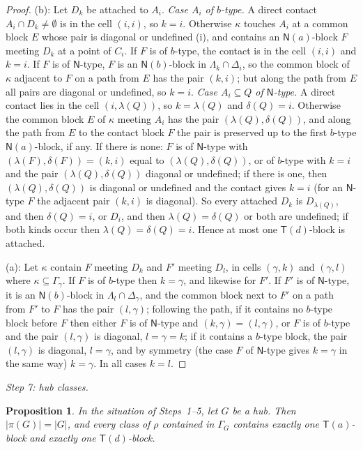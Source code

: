 \documentclass[11pt]{amsart}
\newtheorem{proposition}[theorem]{Proposition}
\theoremstyle{definition}
\newcommand{\T}{\mathsf{T}}
\newcommand{\N}{\mathsf{N}}
\begin{document}
\begin{proof}
(b): Let $D_k$ be attached to $A_i$. \emph{Case $A_i$ of $b$-type.} A direct contact $A_i\cap D_k\ne\emptyset$ is in the cell $(i,i)$, so $k=i$. Otherwise $\kappa$ touches $A_i$ at a common block $E$ whose pair is diagonal or undefined (i), and contains an $\N(a)$-block $F$ meeting $D_k$ at a point of $C_i$. If $F$ is of $b$-type, the contact is in the cell $(i,i)$ and $k=i$. If $F$ is of $\N$-type, $F$ is an $\N(b)$-block in $\Lambda_k\cap\Delta_i$, so the common block of $\kappa$ adjacent to $F$ on a path from $E$ has the pair $(k,i)$; but along the path from $E$ all pairs are diagonal or undefined, so $k=i$. \emph{Case $A_i\subseteq Q$ of $\N$-type.} A direct contact lies in the cell $(i,\lambda(Q))$, so $k=\lambda(Q)$ and $\delta(Q)=i$. Otherwise the common block $E$ of $\kappa$ meeting $A_i$ has the pair $(\lambda(Q),\delta(Q))$, and along the path from $E$ to the contact block $F$ the pair is preserved up to the first $b$-type $\N(a)$-block, if any. If there is none: $F$ is of $\N$-type with $(\lambda(F),\delta(F))=(k,i)$ equal to $(\lambda(Q),\delta(Q))$, or of $b$-type with $k=i$ and the pair $(\lambda(Q),\delta(Q))$ diagonal or undefined; if there is one, then $(\lambda(Q),\delta(Q))$ is diagonal or undefined and the contact gives $k=i$ (for an $\N$-type $F$ the adjacent pair $(k,i)$ is diagonal). So every attached $D_k$ is $D_{\lambda(Q)}$, and then $\delta(Q)=i$, or $D_i$, and then $\lambda(Q)=\delta(Q)$ or both are undefined; if both kinds occur then $\lambda(Q)=\delta(Q)=i$. Hence at most one $\T(d)$-block is attached.

(a): Let $\kappa$ contain $F$ meeting $D_k$ and $F'$ meeting $D_l$, in cells $(\gamma,k)$ and $(\gamma,l)$ where $\kappa\subseteq\Gamma_\gamma$. If $F$ is of $b$-type then $k=\gamma$, and likewise for $F'$. If $F'$ is of $\N$-type, it is an $\N(b)$-block in $\Lambda_l\cap\Delta_\gamma$, and the common block next to $F'$ on a path from $F'$ to $F$ has the pair $(l,\gamma)$; following the path, if it contains no $b$-type block before $F$ then either $F$ is of $\N$-type and $(k,\gamma)=(l,\gamma)$, or $F$ is of $b$-type and the pair $(l,\gamma)$ is diagonal, $l=\gamma=k$; if it contains a $b$-type block, the pair $(l,\gamma)$ is diagonal, $l=\gamma$, and by symmetry (the case $F$ of $\N$-type gives $k=\gamma$ in the same way) $k=\gamma$. In all cases $k=l$.
\end{proof}

\smallskip
\emph{Step 7: hub classes.}

\begin{proposition}\label{prop:Qh}
In the situation of Steps~\textup{1--5}, let $G$ be a hub. Then $|\pi(G)|=|G|$, and every class of $\rho$ contained in $\Gamma_G$ contains exactly one $\T(a)$-block and exactly one $\T(d)$-block.
\end{proposition}
\end{document}
